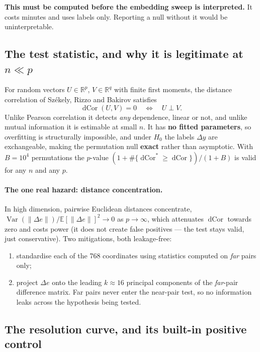 \documentclass[11pt,a4paper]{article}
\newcommand{\dcor}{\operatorname{dCor}}
\newcommand{\Var}{\operatorname{Var}}
\newcommand{\E}{\mathbb{E}}
\newcommand{\R}{\mathbb{R}}
\begin{document}
\textbf{This must be computed before the embedding sweep is interpreted.} It costs minutes
and uses labels only. Reporting a null without it would be uninterpretable.

\subsection{The test statistic, and why it is legitimate at $n \ll p$}

For random vectors $U \in \R^{p}$, $V \in \R^{q}$ with finite first moments, the distance
correlation of Sz\'ekely, Rizzo and Bakirov satisfies
\begin{equation}
  \dcor(U,V) = 0 \quad\Longleftrightarrow\quad U \perp V .
\end{equation}
Unlike Pearson correlation it detects \emph{any} dependence, linear or not, and unlike
mutual information it is estimable at small $n$. It has \textbf{no fitted parameters}, so
overfitting is structurally impossible, and under $H_0$ the labels $\Delta y$ are
exchangeable, making the permutation null \textbf{exact} rather than asymptotic.
With $B = 10^4$ permutations the $p$-value $(1 + \#\{\dcor^\ast \ge \dcor\})/(1+B)$ is
valid for any $n$ and any $p$.

\paragraph{The one real hazard: distance concentration.} In high dimension, pairwise
Euclidean distances concentrate,
$\Var(\lVert \Delta e\rVert)/\E[\lVert \Delta e\rVert]^2 \to 0$ as $p \to \infty$, which
attenuates $\dcor$ towards zero and costs power (it does not create false positives ---
the test stays valid, just conservative). Two mitigations, both leakage-free:
\begin{enumerate}[nosep]
  \item standardise each of the 768 coordinates using statistics computed on
        \emph{far} pairs only;
  \item project $\Delta e$ onto the leading $k \approx 16$ principal components of the
        \emph{far}-pair difference matrix. Far pairs never enter the near-pair test, so
        no information leaks across the hypothesis being tested.
\end{enumerate}

\subsection{The resolution curve, and its built-in positive control}
\end{document}

